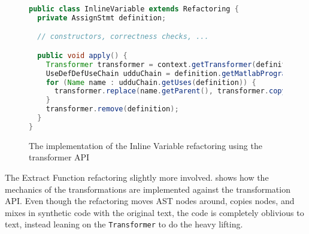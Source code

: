 \begin{figure}
\begin{lstlisting}[numbers=none, language=Java]
public class InlineVariable extends Refactoring {
  private AssignStmt definition;

  // constructors, correctness checks, ...

  public void apply() {
    Transformer transformer = context.getTransformer(definition);
    UseDefDefUseChain udduChain = definition.getMatlabProgram().analyze().getUseDefDefUseChain();
    for (Name name : udduChain.getUses(definition)) {
      transformer.replace(name.getParent(), transformer.copy(definition.getRHS()));
    }
    transformer.remove(definition);
  }
}
\end{lstlisting}
\caption{The implementation of the Inline Variable refactoring using the transformer API}
\label{Fig:InlineVariable}
\end{figure}

The Extract Function refactoring slightly more involved.
 shows how the mechanics of the transformations are
implemented against the transformation API. Even though the refactoring moves
AST nodes around, copies nodes, and mixes in synthetic code with the original text,
the code is completely oblivious to text, instead leaning on the {\tt Transformer}
to do the heavy lifting.

